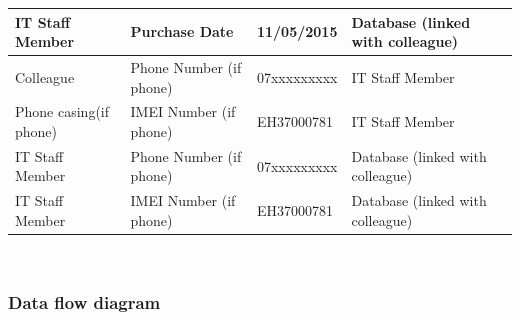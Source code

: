 \begin{longtable}{|p{3cm}|p{3cm}|p{3cm}|p{3cm}|}
IT Staff Member                       & Purchase Date                      & 11/05/2015                                         & Database (linked with colleague)          \\ \hline
Colleague                       & Phone Number (if phone)            & 07xxxxxxxxx                                        & IT Staff Member          \\ \hline
Phone casing(if phone)		&IMEI Number (if phone)            & EH37000781                                      & IT Staff Member          \\ \hline	
IT Staff Member & Phone Number (if phone)            & 07xxxxxxxxx & Database (linked with colleague) \\ \hline
IT Staff Member & IMEI Number (if phone)           &EH37000781        & Database (linked with colleague) \\ \hline
\end{longtable}
\

\subsubsection{Data flow diagram}

